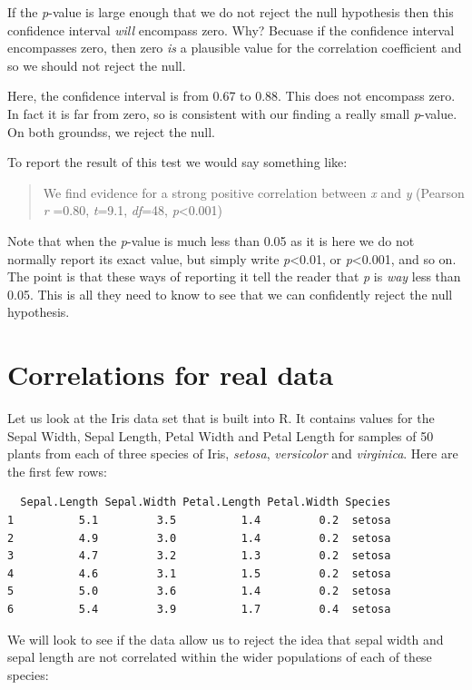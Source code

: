 \documentclass[
  letterpaper,
  DIV=11,
  numbers=noendperiod]{scrreprt}
\begin{document}
If the \emph{p}-value is large enough that we do not reject the null
hypothesis then this confidence interval \emph{will} encompass zero.
Why? Becuase if the confidence interval encompasses zero, then zero
\emph{is} a plausible value for the correlation coefficient and so we
should not reject the null.

Here, the confidence interval is from 0.67 to 0.88. This does not
encompass zero. In fact it is far from zero, so is consistent with our
finding a really small \emph{p}-value. On both groundss, we reject the
null.

To report the result of this test we would say something like:

\begin{quote}
We find evidence for a strong positive correlation between \emph{x} and
\emph{y} (Pearson \emph{r} =0.80, \emph{t}=9.1, \emph{df}=48,
\emph{p}\textless0.001)
\end{quote}

Note that when the \emph{p}-value is much less than 0.05 as it is here
we do not normally report its exact value, but simply write
\emph{p}\textless0.01, or \emph{p}\textless0.001, and so on. The point
is that these ways of reporting it tell the reader that \emph{p} is
\emph{way} less than 0.05. This is all they need to know to see that we
can confidently reject the null hypothesis.

\section{Correlations for real data}\label{sec-iris-correlation}

Let us look at the Iris data set that is built into R. It contains
values for the Sepal Width, Sepal Length, Petal Width and Petal Length
for samples of 50 plants from each of three species of Iris,
\emph{setosa}, \emph{versicolor} and \emph{virginica}. Here are the
first few rows:

\begin{verbatim}
  Sepal.Length Sepal.Width Petal.Length Petal.Width Species
1          5.1         3.5          1.4         0.2  setosa
2          4.9         3.0          1.4         0.2  setosa
3          4.7         3.2          1.3         0.2  setosa
4          4.6         3.1          1.5         0.2  setosa
5          5.0         3.6          1.4         0.2  setosa
6          5.4         3.9          1.7         0.4  setosa
\end{verbatim}

We will look to see if the data allow us to reject the idea that sepal
width and sepal length are not correlated within the wider populations
of each of these species:
\end{document}
